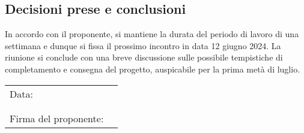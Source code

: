 \documentclass[italian,12pt]{article}
\begin{document}
\subsection{Decisioni prese e conclusioni}
In accordo con il proponente, si mantiene la durata del periodo di lavoro di una settimana e dunque si fissa il prossimo incontro in data
12 giugno 2024. La riunione si conclude con una breve discussione sulle possibile tempistiche di completamento e consegna del progetto,
auspicabile per la prima metà di luglio.

\newpage
\begin{table}[b]
	\begin{tabular}{@{}p{5cm}p{10cm}@{}}
		Data:  & \hrulefill \\
		       &            \\
		       &            \\
		Firma del proponente: & \hrulefill \\
	\end{tabular}
\end{table}
\end{document}

